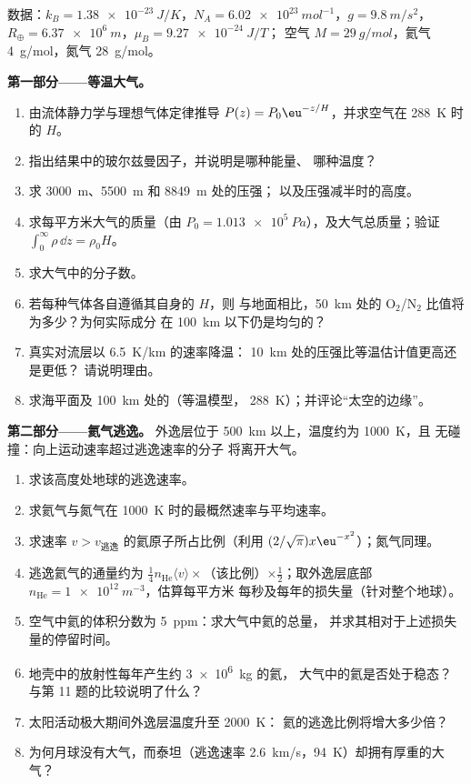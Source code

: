 \begin{problem}\label{pb:b2:boltzmann-factor:1}
数据：$k_B = \qty{1.38e-23}{J/K}$，$N_A = \qty{6.02e23}{mol^{-1}}$，$g =
\qty{9.8}{m/s^2}$，$R_{\oplus} = \qty{6.37e6}{m}$，$\mu_B = \qty{9.27e-24}{J/T}$；
空气 $M = \qty{29}{g/mol}$，氦气 \qty{4}{g/mol}，氮气 \qty{28}{g/mol}。

\textbf{第一部分——等温大气。}
\begin{enumerate}
  \item 由流体静力学与理想气体定律推导 $P(z) =
        P_0\eu^{-z/H}$，并求空气在 \qty{288}{K} 时的 $H$。
  \item 指出结果中的玻尔兹曼因子，并说明是哪种能量、
        哪种温度？
  \item 求 \qty{3000}{m}、\qty{5500}{m} 和 \qty{8849}{m} 处的压强；
        以及压强减半时的高度。
  \item 求每平方米大气的质量（由 $P_0 =
        \qty{1.013e5}{Pa}$），及大气总质量；验证 $\int_0^\infty
        \rho\,\dd z = \rho_0H$。
  \item 求大气中的分子数。
  \item 若每种气体各自遵循其自身的 $H$，则
        与地面相比，\qty{50}{km} 处的 O$_2$/N$_2$ 比值将为多少？为何实际成分
        在 \qty{100}{km} 以下仍是均匀的？
  \item 真实对流层以 \qty{6.5}{K/km} 的速率降温：
        \qty{10}{km} 处的压强比等温估计值更高还是更低？
        请说明理由。
  \item 求海平面及 \qty{100}{km} 处的（等温模型，
        \qty{288}{K}）；并评论“太空的边缘”。
\end{enumerate}

\textbf{第二部分——氦气逃逸。}
外逸层位于 \qty{500}{km} 以上，温度约为 \qty{1000}{K}，且
无碰撞：向上运动速率超过逃逸速率的分子
将离开大气。
\begin{enumerate}[resume]
  \item 求该高度处地球的逃逸速率。
  \item 求氦气与氮气在
        \qty{1000}{K} 时的最概然速率与平均速率。
  \item 求速率 $v > v_{\text{逃逸}}$ 的氦原子所占比例（利用
        $(2/\sqrt\pi)x\eu^{-x^2}$）；氮气同理。
  \item 逃逸氦气的通量约为 $\tfrac14n_{\text{He}}\langle
        v\rangle \times$（该比例）$\times\tfrac12$；取外逸层底部 $n_{\text{He}}
        = \qty{1e12}{m^{-3}}$，估算每平方米
        每秒及每年的损失量（针对整个地球）。
  \item 空气中氦的体积分数为 \qty{5}{ppm}：求大气中氦的总量，
        并求其相对于上述损失量的停留时间。
  \item 地壳中的放射性每年产生约 \qty{3e6}{kg} 的氦，
        大气中的氦是否处于稳态？
        与第 11 题的比较说明了什么？
  \item 太阳活动极大期间外逸层温度升至 \qty{2000}{K}：
        氦的逃逸比例将增大多少倍？
  \item 为何月球没有大气，而泰坦（逃逸速率
        \qty{2.6}{km/s}，\qty{94}{K}）却拥有厚重的大气？
\end{enumerate}


\end{problem}
